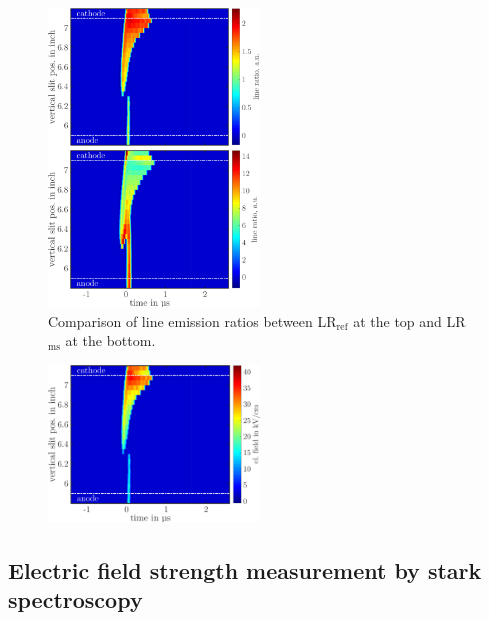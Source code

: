 \documentclass[a4paper,10pt,twoside]{article}
\newcommand{\ix}[1]{_\text{#1}}
\begin{document}
				\begin{figure}
					\centering
					\hspace{-0.5cm}\includegraphics[width=0.5\textwidth]{figures/lineratio/lineratios.pdf}
					\caption{Comparison of line emission ratios between LR$\ix{ref}$ at the top and LR$\ix{ms}$ at the bottom.}
					\label{img:comparisonlineratio}
				\end{figure}
				
				\begin{figure}
					\centering
					\hspace{0.5cm}\includegraphics[width=0.5\textwidth]{figures/lineratio/elfield667.pdf}
					\caption{}
					\label{img:elfield667}
				\end{figure}
		
		\subsection{Electric field strength measurement by stark spectroscopy}
		
\end{document}
